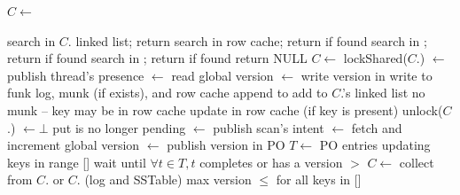 \begin{algorithm}[tb]
\begin{algorithmic}[1]{}
		\State $C \leftarrow$ 




			\State search  in $C$. linked list;  return 
		\EndIf
		\State search  in row cache; return  if found
			\State	search  in ; return  if found
		\EndIf
		\State	search  in ; return  if found
		\State return NULL	
\EndProcedure
\Statex
{}	
		\State $C \leftarrow$ 
		\State lockShared($C$.)
		\State  {}  $\leftarrow$ 
			 \Comment publish  thread's presence 
		\State {} $\leftarrow$    \Comment read global version
		\State  {}  $\leftarrow$ 
			\Comment write version in 
		\Statex \Comment write  to funk log, munk (if exists), and row cache  
		\State append  to 
			\State add   to $C$.'s linked list
		\Else \Comment no munk -- key may be in row cache
		\State update  in row cache (if key is present)
		\EndIf
		\State unlock($C$.)
		\State {}  $\leftarrow \bot$ \Comment put is no longer pending
\EndProcedure
\Statex
{}
		\State  {}  $\leftarrow$  \Comment publish scan's intent 
		\State {} $\leftarrow$    \Comment fetch and increment global version
		\State  {}  $\leftarrow$ 
		\Comment publish version in PO
		\State  $T \leftarrow $  PO entries updating keys in range [] 
		\State wait until $\forall t \in T, t$  completes or has a version $>$   
		\State $C \leftarrow$ 
		\Repeat
				\State collect from $C$. or $C$. (log and SSTable)
				\Statex \hspace{1cm} max version $\le$ for all keys in [] 


\end{algorithmic}
\end{algorithm}
